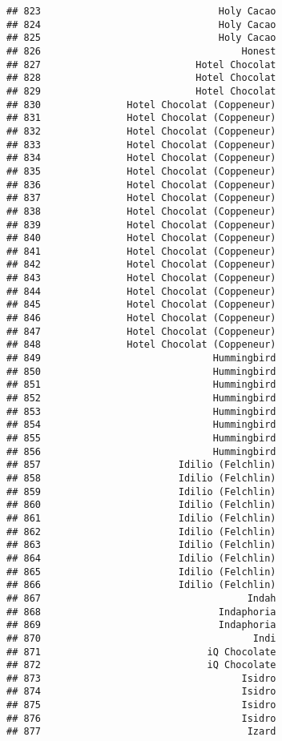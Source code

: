 \documentclass[
]{article}
\begin{document}
\begin{verbatim}
## 823                               Holy Cacao
## 824                               Holy Cacao
## 825                               Holy Cacao
## 826                                   Honest
## 827                           Hotel Chocolat
## 828                           Hotel Chocolat
## 829                           Hotel Chocolat
## 830               Hotel Chocolat (Coppeneur)
## 831               Hotel Chocolat (Coppeneur)
## 832               Hotel Chocolat (Coppeneur)
## 833               Hotel Chocolat (Coppeneur)
## 834               Hotel Chocolat (Coppeneur)
## 835               Hotel Chocolat (Coppeneur)
## 836               Hotel Chocolat (Coppeneur)
## 837               Hotel Chocolat (Coppeneur)
## 838               Hotel Chocolat (Coppeneur)
## 839               Hotel Chocolat (Coppeneur)
## 840               Hotel Chocolat (Coppeneur)
## 841               Hotel Chocolat (Coppeneur)
## 842               Hotel Chocolat (Coppeneur)
## 843               Hotel Chocolat (Coppeneur)
## 844               Hotel Chocolat (Coppeneur)
## 845               Hotel Chocolat (Coppeneur)
## 846               Hotel Chocolat (Coppeneur)
## 847               Hotel Chocolat (Coppeneur)
## 848               Hotel Chocolat (Coppeneur)
## 849                              Hummingbird
## 850                              Hummingbird
## 851                              Hummingbird
## 852                              Hummingbird
## 853                              Hummingbird
## 854                              Hummingbird
## 855                              Hummingbird
## 856                              Hummingbird
## 857                        Idilio (Felchlin)
## 858                        Idilio (Felchlin)
## 859                        Idilio (Felchlin)
## 860                        Idilio (Felchlin)
## 861                        Idilio (Felchlin)
## 862                        Idilio (Felchlin)
## 863                        Idilio (Felchlin)
## 864                        Idilio (Felchlin)
## 865                        Idilio (Felchlin)
## 866                        Idilio (Felchlin)
## 867                                    Indah
## 868                               Indaphoria
## 869                               Indaphoria
## 870                                     Indi
## 871                             iQ Chocolate
## 872                             iQ Chocolate
## 873                                   Isidro
## 874                                   Isidro
## 875                                   Isidro
## 876                                   Isidro
## 877                                    Izard

\end{verbatim}
\end{document}
